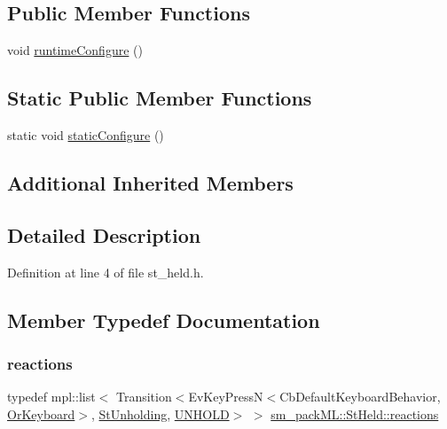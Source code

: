\subsection*{Public Member Functions}
\begin{DoxyCompactItemize}
\item 
void \hyperlink{structsm__packML_1_1StHeld_a58e225d37891ed694b2bf6da41bc802c}{runtime\+Configure} ()
\end{DoxyCompactItemize}
\subsection*{Static Public Member Functions}
\begin{DoxyCompactItemize}
\item 
static void \hyperlink{structsm__packML_1_1StHeld_a18fcebb225f7c4893932b8b9c3de4276}{static\+Configure} ()
\end{DoxyCompactItemize}
\subsection*{Additional Inherited Members}


\subsection{Detailed Description}


Definition at line 4 of file st\+\_\+held.\+h.



\subsection{Member Typedef Documentation}
\mbox{\label{structsm__packML_1_1StHeld_acced2f8015ea42707a87101aa52c1621}} 
\subsubsection{\texorpdfstring{reactions}{reactions}}
{\footnotesize\ttfamily typedef mpl\+::list$<$ Transition$<$Ev\+Key\+PressN$<$Cb\+Default\+Keyboard\+Behavior, \hyperlink{classsm__packML_1_1OrKeyboard}{Or\+Keyboard}$>$, \hyperlink{structsm__packML_1_1StUnholding}{St\+Unholding}, \hyperlink{structsm__packML_1_1StHeld_1_1UNHOLD}{U\+N\+H\+O\+LD}$>$ $>$ \hyperlink{structsm__packML_1_1StHeld_acced2f8015ea42707a87101aa52c1621}{sm\+\_\+pack\+M\+L\+::\+St\+Held\+::reactions}}



